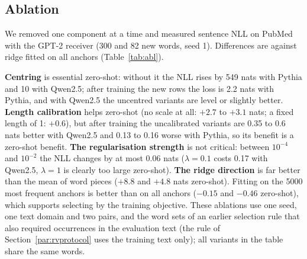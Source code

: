 \documentclass[preprint,12pt]{elsarticle}
\begin{document}
\subsection{Ablation}
\label{sec:ablation}
We removed one component at a time and measured sentence NLL on PubMed with the GPT-2 receiver (300 and 82 new words, seed 1). Differences are against ridge fitted on all anchors (Table~\ref{tab:abl}).
\begin{table}[t]
\centering\small
\caption{Ablations (nats per sentence; positive = the ablation is worse than ridge on all anchors). $^{*}$ 95\,\% interval excludes 0. First row: full ridge against the unchanged receiver.}
\label{tab:abl}
\resizebox{\textwidth}{!}{}
\end{table}
\textbf{Centring} is essential zero-shot: without it the NLL rises by 549 nats with Pythia and 10 with Qwen2.5; after training the new rows the loss is 2.2 nats with Pythia, and with Qwen2.5 the uncentred variants are level or slightly better. \textbf{Length calibration} helps zero-shot (no scale at all: $+2.7$ to $+3.1$ nats; a fixed length of 1: $+0.6$), but after training the uncalibrated variants are 0.35 to 0.6 nats better with Qwen2.5 and 0.13 to 0.16 worse with Pythia, so its benefit is a zero-shot benefit. \textbf{The regularisation strength} is not critical: between $10^{-4}$ and $10^{-2}$ the NLL changes by at most 0.06 nats ($\lambda=0.1$ costs 0.17 with Qwen2.5, $\lambda=1$ is clearly too large zero-shot). \textbf{The ridge direction} is far better than the mean of word pieces ($+8.8$ and $+4.8$ nats zero-shot). Fitting on the 5000 most frequent anchors is better than on all anchors ($-0.15$ and $-0.46$ zero-shot), which supports selecting by the training objective. These ablations use one seed, one text domain and two pairs, and the word sets of an earlier selection rule that also required occurrences in the evaluation text (the rule of Section~\ref{par:rvprotocol} uses the training text only); all variants in the table share the same words.
\end{document}
